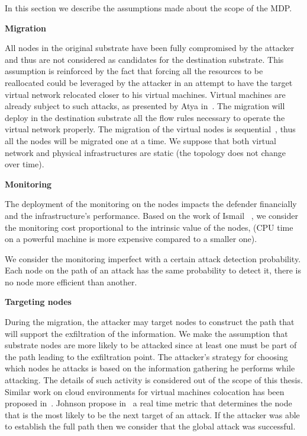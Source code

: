 \label{sec:hypotheses}
In this section we describe the assumptions made about the scope of the MDP.

\textbf{Migration}

All nodes in the original substrate have been fully compromised by the attacker and thus are not considered as candidates for the destination substrate.  
This assumption is reinforced by the fact that forcing all the resources to be reallocated could be leveraged by the attacker in an attempt to have the target virtual network relocated closer to his virtual machines.
Virtual machines are already subject to such attacks, as presented by Atya \etal in~\cite{stalling-atya2017,malicious-atya2017}.
The migration will deploy in the destination substrate all the flow rules necessary to operate the virtual network properly. The migration of the virtual nodes is sequential~\cite{Lime-Ghorbani2014}, thus all the nodes will be migrated one at a time.
We suppose that both virtual network and physical infrastructures are static (\ie the topology does not change over time).

\textbf{Monitoring}

The deployment of the monitoring on the nodes impacts the defender financially and the infrastructure's performance. Based on the work of Ismail \etal~\cite{interdep-ismail2017}, we consider the monitoring cost  proportional to the intrinsic value of the nodes, (\eg CPU time on a powerful machine is more expensive compared to a smaller one). 

We consider the monitoring imperfect with a certain attack detection probability.
Each node on the path of an attack has the same probability to detect it, \eg there is no node more efficient than another. 

\textbf{Targeting nodes}
\label{sec:attacking}

During the migration, the attacker may target nodes to construct the path that will support the exfiltration of the information.
We make the assumption that substrate nodes are more likely to be attacked since at least one must be part of the path leading to the exfiltration point.
The attacker's strategy for choosing which nodes he attacks is based on the information gathering he performs while attacking. The details of such activity is considered out of the scope of this thesis.
Similar work on cloud environments for virtual machines colocation has been proposed in~\cite{getoffmucloud-Ristenpart2009, incentivemtd-Zhang2012}.
Johnson \etal propose in~\cite{mitigateAPT-johnson2013} a real time metric that determines the node that is the most likely to be the next target of an attack.
If the attacker was able to establish the full path then we consider that the global attack was successful.